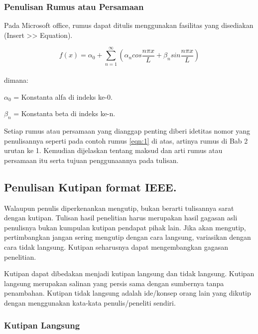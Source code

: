 \documentclass{thesis}
\begin{document}
\vspace{20mm}
\subsubsection{Penulisan Rumus atau Persamaan}

Pada Microsoft office, rumus dapat ditulis menggunakan fasilitas yang disediakan (Insert >> Equation).

\begin{equation}\label{eqn:1}
    f(x)=\alpha_{0}+\sum_{n=1}^{\infty}(\alpha_{n}cos{\frac{{n}\pi{x}}{L}}+\beta_{n}sin{\frac{{n}\pi{x}}{L}})
\end{equation}\\
dimana:

	$\alpha_{0}$ = Konstanta alfa di indeks ke-0.
	
	$\beta_{n}$ = Konstanta beta di indeks ke-n.
	
Setiap rumus atau persamaan yang dianggap penting diberi idetitas nomor yang penulisannya seperti pada contoh rumus 
\eqref{eqn:1} di atas, artinya rumus di Bab 2 urutan ke 1. Kemudian dijelaskan tentang maksud dan arti rumus atau persamaan itu serta tujuan penggunaannya pada tulisan.

\subsection{Penulisan Kutipan format IEEE.}

Walaupun penulis diperkenankan mengutip, bukan berarti tulisannya sarat dengan kutipan. Tulisan hasil penelitian harus merupakan hasil gagasan asli penulisnya bukan kumpulan kutipan pendapat pihak lain. Jika akan mengutip, pertimbangkan jangan sering mengutip dengan cara langsung, variasikan dengan cara tidak langsung. Kutipan seharusnya dapat mengembangkan gagasan penelitian.

Kutipan dapat dibedakan menjadi kutipan langsung dan tidak langsung. Kutipan langsung merupakan salinan yang persis sama dengan sumbernya tanpa penambahan. Kutipan tidak langsung adalah ide/konsep orang lain yang dikutip dengan menggunakan kata-kata penulis/peneliti sendiri.

\subsubsection{Kutipan Langsung}
\end{document}
